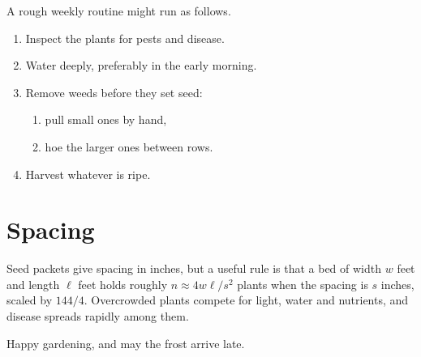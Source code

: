 \documentclass[11pt,letterpaper]{article}
\begin{document}
A rough weekly routine might run as follows.
\begin{enumerate}
\item Inspect the plants for pests and disease.
\item Water deeply, preferably in the early morning.
\item Remove weeds before they set seed:
  \begin{enumerate}
  \item pull small ones by hand,
  \item hoe the larger ones between rows.
  \end{enumerate}
\item Harvest whatever is ripe.
\end{enumerate}

\section{Spacing}
Seed packets give spacing in inches, but a useful rule is that a bed of width
$w$ feet and length $\ell$ feet holds roughly $n \approx 4w\ell/s^2$ plants when
the spacing is $s$ inches, scaled by $144/4$. Overcrowded plants compete for
light, water and nutrients, and disease spreads rapidly among them.

\bigskip
\begin{center}
Happy gardening, and may the frost arrive late.
\end{center}
\end{document}
